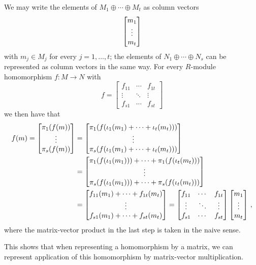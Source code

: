 \begin{fluff}
  We may write the elements of $M_1 \oplus \dotsb \oplus M_t$ as column vectors
  \[
    \begin{bmatrix}m_1 \\ \vdots \\ m_t\end{bmatrix}
  \]
  with $m_j \in M_j$ for every $j = 1, \dotsc, t$;
  the elements of $N_1 \oplus \dotsb \oplus N_s$ can be represented as column vectors in the same way.
  For every $R$-module homomorphism $f \colon M \to N$ with
  \[
      f
    = \begin{bmatrix}
        f_{11}  & \cdots  & f_{1t}  \\
        \vdots  & \ddots  & \vdots  \\
        f_{s1}  & \cdots  & f_{st}
      \end{bmatrix}
  \]
  we then have that
  \begin{align*}
        f(m)
     =  \begin{bmatrix} \pi_1(f(m)) \\ \vdots \\ \pi_s(f(m)) \end{bmatrix}
    &=  \begin{bmatrix}
          \pi_1( f( \iota_1(m_1) + \dotsb + \iota_t(m_t) ) )
          \\
          \vdots
          \\
          \pi_s( f( \iota_1(m_1) + \dotsb + \iota_t(m_t) ) )
        \end{bmatrix}
    \\
    &=  \begin{bmatrix}
          \pi_1(f(\iota_1(m_1))) + \dotsb + \pi_1(f(\iota_t(m_t)))
          \\
          \vdots
          \\
          \pi_s(f(\iota_1(m_1))) + \dotsb + \pi_s(f(\iota_t(m_t)))
        \end{bmatrix}
    \\
    &=  \begin{bmatrix}
          f_{11}(m_1) + \dotsb + f_{1t}(m_t)
          \\
          \vdots
          \\
          f_{s1}(m_1) + \dotsb + f_{st}(m_t)
        \end{bmatrix}
    = \begin{bmatrix}
        f_{11}  & \cdots  & f_{1t}  \\
        \vdots  & \ddots  & \vdots  \\
        f_{s1}  & \cdots  & f_{st}
      \end{bmatrix}
      \begin{bmatrix}m_1 \\ \vdots \\ m_t\end{bmatrix} \,,
  \end{align*}
  where the matrix-vector product in the last step is taken in the naive sense.
  
  This shows that when representing a homomorphism by a matrix, we can represent application of this homomorphism by matrix-vector multiplication.
\end{fluff}


